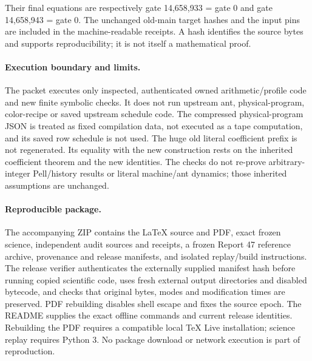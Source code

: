\documentclass[11pt,letterpaper]{article}
\theoremstyle{definition}\newtheorem{definition}[theorem]{Definition}
\theoremstyle{remark}\newtheorem{remark}[theorem]{Remark}
\begin{document}
Their final equations are respectively gate 14,658,933 = gate 0 and gate 14,658,943 = gate 0. The unchanged old-main target hashes and the input pins are included in the machine-readable receipts. A hash identifies the source bytes and supports reproducibility; it is not itself a mathematical proof.

\paragraph{Execution boundary and limits.}
The packet executes only inspected, authenticated owned arithmetic/profile code and new finite symbolic checks. It does not run upstream ant, physical-program, color-recipe or saved upstream schedule code. The compressed physical-program JSON is treated as fixed compilation data, not executed as a tape computation, and its saved row schedule is not used. The huge old literal coefficient prefix is not regenerated. Its equality with the new construction rests on the inherited coefficient theorem and the new identities. The checks do not re-prove arbitrary-integer Pell/history results or literal machine/ant dynamics; those inherited assumptions are unchanged.

\paragraph{Reproducible package.}
The accompanying ZIP contains the LaTeX source and PDF, exact frozen science, independent audit sources and receipts, a frozen Report 47 reference archive, provenance and release manifests, and isolated replay/build instructions. The release verifier authenticates the externally supplied manifest hash before running copied scientific code, uses fresh external output directories and disabled bytecode, and checks that original bytes, modes and modification times are preserved. PDF rebuilding disables shell escape and fixes the source epoch. The README supplies the exact offline commands and current release identities. Rebuilding the PDF requires a compatible local TeX Live installation; science replay requires Python 3. No package download or network execution is part of reproduction.
\end{document}
